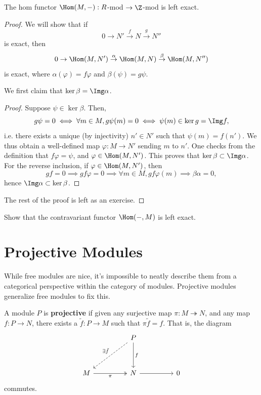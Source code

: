 \begin{thm}
    The hom functor $\Hom(M,-):R$-mod $\to \Z$-mod is left exact.
\end{thm}

\begin{proof}
    We will show that if
    $$0 \to N' \overset{f}{\to} N \overset{g}{\to} N''$$
    is exact, then
    $$0 \to \Hom(M,N') \overset{\alpha}{\to} \Hom(M,N) \overset{\beta}{\to} \Hom(M,N'')$$
    is exact, where $\alpha(\varphi) = f\varphi$ and $\beta ( \psi ) = g\psi$.

    We first claim that $\ker \beta = \Img \alpha$.
\begin{proof}
    Suppose $\psi \in \ker \beta$. Then,
    $$g\psi =0 \iff \forall m \in M,g\psi (m)=0 \iff \psi (m) \in \ker g  =\Img f,$$
    i.e. there exists a unique (by injectivity) $n' \in N'$ such that $\psi (m) = f(n')$. We thus obtain a well-defined map $\varphi :M \to N'$ sending $m$ to $n'$. One checks from the definition that $f \varphi = \psi$, and $\varphi \in \Hom(M,N')$. This proves that $\ker \beta \subset \Img \alpha$. For the reverse inclusion, if $\varphi \in \Hom(M,N')$, then
    $$gf=0 \implies gf \varphi =0 \implies \forall m \in M, gf\varphi(m) \implies \beta \alpha = 0,$$
    hence $\Img \alpha \subset \ker \beta$.
\end{proof}

    The rest of the proof is left as an exercise.
\end{proof}

\begin{notebox*}[Exercise]
    Show that the contravariant functor $\Hom(-,M)$ is left exact.
\end{notebox*}

\section{Projective Modules}

While free modules are nice, it's impossible to neatly describe them from a categorical perspective within the category of modules. Projective modules generalize free modules to fix this.

\begin{defn}
    A module $P$ is \textbf{projective} if given any surjective map $\pi :M \twoheadrightarrow N$, and any map $f : P \to N$, there exists a $\tilde f:P \to M$ such that $\pi \tilde f = f$. That is, the diagram
    \[\begin{tikzcd}[ampersand replacement=\&]
    	\&\& P \&\& \\
    	\\
    	M \&\& N \&\& 0
    	\arrow["{\exists \tilde f}"', dashed, from=1-3, to=3-1]
    	\arrow["f", from=1-3, to=3-3]
    	\arrow["\pi"', two heads, from=3-1, to=3-3]
    	\arrow[""', from=3-3, to=3-5]
    \end{tikzcd}\]
    commutes.
\end{defn}

